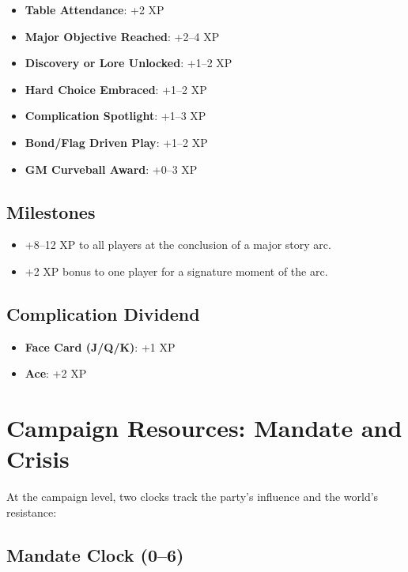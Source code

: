 \begin{itemize}
    \item \textbf{Table Attendance}: +2 XP
    \item \textbf{Major Objective Reached}: +2--4 XP
    \item \textbf{Discovery or Lore Unlocked}: +1--2 XP
    \item \textbf{Hard Choice Embraced}: +1--2 XP
    \item \textbf{Complication Spotlight}: +1--3 XP
    \item \textbf{Bond/Flag Driven Play}: +1--2 XP
    \item \textbf{GM Curveball Award}: +0--3 XP
\end{itemize}

\subsection*{Milestones}

\begin{itemize}
    \item +8--12 XP to all players at the conclusion of a major story arc.
    \item +2 XP bonus to one player for a signature moment of the arc.
\end{itemize}

\subsection*{Complication Dividend}

\begin{itemize}
    \item \textbf{Face Card (J/Q/K)}: +1 XP
    \item \textbf{Ace}: +2 XP
\end{itemize}

\section*{Campaign Resources: Mandate and Crisis}

At the campaign level, two clocks track the party's influence and the world's resistance:

\subsection*{Mandate Clock (0--6)}

